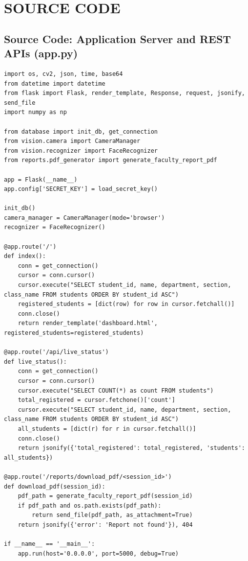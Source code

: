 \documentclass[10pt]{report}
\begin{document}
\chapter{SOURCE CODE}

\section{Source Code: Application Server and REST APIs (app.py)}
\begin{lstlisting}[caption={Application Server and REST Endpoints (app.py)}]
import os, cv2, json, time, base64
from datetime import datetime
from flask import Flask, render_template, Response, request, jsonify, send_file
import numpy as np

from database import init_db, get_connection
from vision.camera import CameraManager
from vision.recognizer import FaceRecognizer
from reports.pdf_generator import generate_faculty_report_pdf

app = Flask(__name__)
app.config['SECRET_KEY'] = load_secret_key()

init_db()
camera_manager = CameraManager(mode='browser')
recognizer = FaceRecognizer()

@app.route('/')
def index():
    conn = get_connection()
    cursor = conn.cursor()
    cursor.execute("SELECT student_id, name, department, section, class_name FROM students ORDER BY student_id ASC")
    registered_students = [dict(row) for row in cursor.fetchall()]
    conn.close()
    return render_template('dashboard.html', registered_students=registered_students)

@app.route('/api/live_status')
def live_status():
    conn = get_connection()
    cursor = conn.cursor()
    cursor.execute("SELECT COUNT(*) as count FROM students")
    total_registered = cursor.fetchone()['count']
    cursor.execute("SELECT student_id, name, department, section, class_name FROM students ORDER BY student_id ASC")
    all_students = [dict(r) for r in cursor.fetchall()]
    conn.close()
    return jsonify({'total_registered': total_registered, 'students': all_students})

@app.route('/reports/download_pdf/<session_id>')
def download_pdf(session_id):
    pdf_path = generate_faculty_report_pdf(session_id)
    if pdf_path and os.path.exists(pdf_path):
        return send_file(pdf_path, as_attachment=True)
    return jsonify({'error': 'Report not found'}), 404

if __name__ == '__main__':
    app.run(host='0.0.0.0', port=5000, debug=True)
\end{lstlisting}
\end{document}
